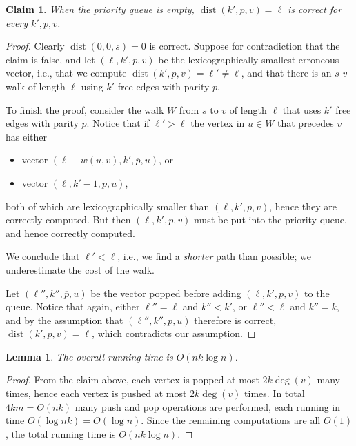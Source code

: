 \documentclass[a4paper]{article}
\DeclareMathOperator{\dist}{dist}
\newtheorem{lemma}{Lemma}
\newtheorem{claim}{Claim}
\begin{document}
\begin{claim}
  When the priority queue is empty, $\dist(k', p, v) = \ell$ is correct
  for every $k', p, v$.
\end{claim}
\begin{proof}
  Clearly $\dist(0, 0, s) = 0$ is correct.  Suppose for contradiction that the
  claim is false, and let $(\ell, k', p, v)$ be the lexicographically smallest
  erroneous vector, i.e., that we compute $\dist(k', p, v) = \ell' \neq \ell$,
  and that there is an $s$-$v$-walk of length $\ell$ using $k'$ free edges with
  parity $p$.

  To finish the proof, consider the walk $W$ from $s$ to $v$ of length $\ell$ that
  uses $k'$ free edges with parity $p$.
  Notice that if $\ell' > \ell$ the vertex in $u \in W$ that precedes $v$ has
  either
  \begin{itemize}
  \item vector $(\ell - w(u,v), k', \overline{p}, u)$, or
  \item vector $(\ell, k' - 1, \overline{p}, u)$,
  \end{itemize}
  both of which are lexicographically smaller than $(\ell, k', p, v)$, hence
  they are correctly computed.  But then $(\ell, k', p, v)$ must be put into
  the priority queue, and hence correctly computed.

  We conclude that $\ell' < \ell$, i.e., we find a \emph{shorter} path than
  possible; we underestimate the cost of the walk.

  Let $(\ell'', k'', \overline p, u)$ be the vector popped before adding
  $(\ell, k', p, v)$ to the queue.  Notice that again, either $\ell'' = \ell$
  and $k'' < k'$, or $\ell'' < \ell$ and $k'' = k$, and by the assumption that
  $(\ell'', k'', \overline p, u)$ therefore is correct,
  $\dist(k', p, v) = \ell$, which contradicts our assumption.
\end{proof}

\begin{lemma}
  The overall running time is $O(nk \log n)$.
\end{lemma}
\begin{proof}
  From the claim above, each vertex is popped at most $2k\deg(v)$ many times,
  hence each vertex is pushed at most $2k\deg(v)$ times.  In total
  $4km = O(nk)$ many push and pop operations are performed, each running in
  time $O(\log nk) = O(\log n)$.  Since the remaining computations are all
  $O(1)$, the total running time is $O(nk \log n)$.
\end{proof}
\end{document}
